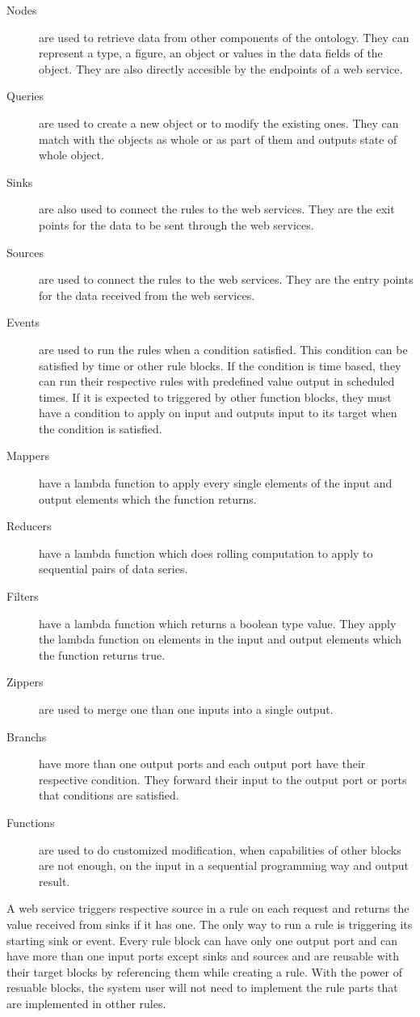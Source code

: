 \begin{description}
  \item [Nodes] are used to retrieve data from other components of the ontology. They can represent a type, a figure, an object or values in the data fields of the object. They are also directly accesible by the endpoints of a web service.
  \item [Queries] are used to create a new object or to modify the existing ones. They can match with the objects as whole or as part of them and outputs state of whole object. 
  \item [Sinks] are also used to connect the rules to the web services. They are the exit points for the data to be sent through the web services.
  \item [Sources] are used to connect the rules to the web services. They are the entry points for the data received from the web services.
  \item [Events] are used to run the rules when a condition satisfied. This condition can be satisfied by time or other rule blocks. If the condition is time based, they can run their respective rules with predefined value output in scheduled times. If it is expected to triggered by other function blocks, they must have a condition to apply on input and outputs input to its target when the condition is satisfied.
  \item [Mappers] have a lambda function to apply every single elements of the input and output elements which the function returns.
  \item [Reducers] have a lambda function which does rolling computation to apply to sequential pairs of data series.
  \item [Filters] have a lambda function which returns a boolean type value. They apply the lambda function on elements in the input and output elements which the function returns true.
  \item [Zippers] are used to merge one than one inputs into a single output.
  \item [Branchs] have more than one output ports and each output port have their respective condition. They forward their input to the output port or ports that conditions are satisfied.
  \item [Functions] are used to do customized modification, when capabilities of other blocks are not enough, on the input in a sequential programming way and output result.
\end{description}

 A web service triggers respective source in a rule on each request and returns the value received from sinks if it has one. The only way to run a rule is triggering its starting sink or event. Every rule block can have only one output port and can have more than one input ports except sinks and sources and are reusable with their target blocks by referencing them while creating a rule. With the power of resuable blocks, the system user will not need to implement the rule parts that are implemented in otther rules.

